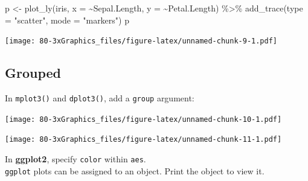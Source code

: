 \documentclass[
]{book}
\newenvironment{Shaded}{\begin{snugshade}}{\end{snugshade}}
\newcommand{\AttributeTok}[1]{\textcolor[rgb]{0.77,0.63,0.00}{#1}}
\newcommand{\FunctionTok}[1]{\textcolor[rgb]{0.00,0.00,0.00}{#1}}
\newcommand{\NormalTok}[1]{#1}
\newcommand{\OtherTok}[1]{\textcolor[rgb]{0.56,0.35,0.01}{#1}}
\newcommand{\SpecialCharTok}[1]{\textcolor[rgb]{0.00,0.00,0.00}{#1}}
\newcommand{\StringTok}[1]{\textcolor[rgb]{0.31,0.60,0.02}{#1}}
\begin{document}
\begin{Shaded}
\begin{Highlighting}[]
\NormalTok{p }\OtherTok{\textless{}{-}} \FunctionTok{plot\_ly}\NormalTok{(iris, }\AttributeTok{x =} \SpecialCharTok{\textasciitilde{}}\NormalTok{Sepal.Length, }\AttributeTok{y =} \SpecialCharTok{\textasciitilde{}}\NormalTok{Petal.Length) }\SpecialCharTok{\%\textgreater{}\%} 
  \FunctionTok{add\_trace}\NormalTok{(}\AttributeTok{type =} \StringTok{"scatter"}\NormalTok{, }\AttributeTok{mode =} \StringTok{"markers"}\NormalTok{)}
\NormalTok{p}
\end{Highlighting}
\end{Shaded}

\texttt{[image: 80-3xGraphics\_files/figure-latex/unnamed-chunk-9-1.pdf]}

\hypertarget{grouped}{%
\subsection{Grouped}\label{grouped}}

In \texttt{mplot3()} and \texttt{dplot3()}, add a \texttt{group} argument:

\begin{Shaded}
\end{Shaded}

\texttt{[image: 80-3xGraphics\_files/figure-latex/unnamed-chunk-10-1.pdf]}

\begin{Shaded}
\end{Shaded}

\texttt{[image: 80-3xGraphics\_files/figure-latex/unnamed-chunk-11-1.pdf]}

In \textbf{ggplot2}, specify \texttt{color} within \texttt{aes}.\\
\texttt{ggplot} plots can be assigned to an object. Print the object to view it.
\end{document}
